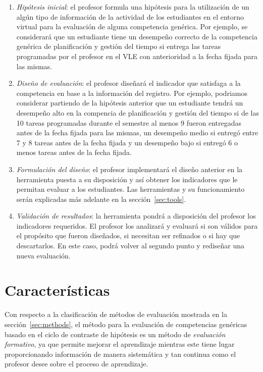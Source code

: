\begin{enumerate}
\item \emph{Hipótesis inicial}: el profesor formula una hipótesis para la utilización de un algún tipo de información de la actividad de los estudiantes en el entorno virtual para la evaluación de alguna competencia genérica. Por ejemplo, se considerará que un estudiante tiene un desempeño correcto de la competencia genérica de planificación y gestión del tiempo si entrega las tareas programadas por el profesor en el VLE con anterioridad a la fecha fijada para las mismas.
\item \emph{Diseño de evaluación}: el profesor diseñará el indicador que satisfaga a la competencia en base a la información del registro. Por ejemplo, podriamos considerar partiendo de la hipótesis anterior que un estudiante tendrá un desempeño alto en la compencia de planificación y gestión del tiempo si de las 10 tareas programadas durante el semestre al menos 9 fueron entregadas antes de la fecha fijada para las mismas, un desempeño medio si entregó entre 7 y 8 tareas antes de la fecha fijada y un desempeño bajo si entregó 6 o menos tareas antes de la fecha fijada.
\item \emph{Formulación del diseño}: el profesor implementará el diseño anterior en la herramienta puesta a su disposición y así obtener los indicadores que le permitan evaluar a los estudiantes. Las herramientas y su funcionamiento serán explicadas más adelante en la sección~\ref{sec:tools}.
\item \emph{Validación de resultados}: la herramienta pondrá a disposición del profesor los indicadores requeridos. El profesor los analizará y evaluará si son válidos para el propósito que fueron diseñados, si necesitan ser refinados o si hay que descartarlos. En este caso, podrá volver al segundo punto y rediseñar una nueva evaluación.
\end{enumerate}

\section{Características}

Con respecto a la clasificación de métodos de evaluación mostrada en la sección~\ref{sec:methods}, el método para la evaluación de competencias genéricas basado en el ciclo de contraste de hipótesis es un método de \emph{evaluación formativo}, ya que permite mejorar el aprendizaje mientras este tiene lugar proporcionando información de manera sistemática y tan continua como el profesor desee sobre el proceso de aprendizaje.


